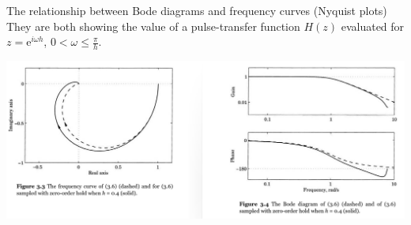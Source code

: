 \documentclass[presentation,aspectratio=169]{beamer}
\begin{document}
\begin{frame}[label={sec:orge210cb8}]{The relationship between Bode diagrams and frequency curves (Nyquist plots)}
They are both showing the value of a pulse-transfer function \(H(z)\) evaluated for \(z = \mathrm{e}^{i\omega h}\), \(0<\omega \le \frac{\pi}{h}\).

\begin{center}
\includegraphics[width=\linewidth]{../../figures/fig3-3-4.png}
\end{center}
\end{frame}
\end{document}
